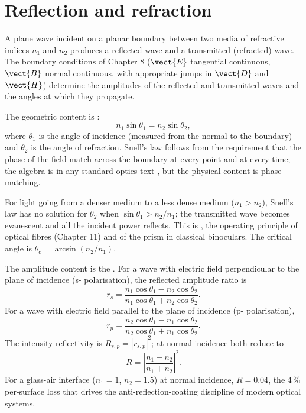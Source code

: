 \section{Reflection and refraction}

A plane wave incident on a planar boundary between two media of
refractive indices $n_{1}$ and $n_{2}$ produces a reflected wave and a
transmitted (refracted) wave. The boundary conditions of Chapter 8
($\vect{E}$ tangential continuous, $\vect{B}$ normal continuous, with
appropriate jumps in $\vect{D}$ and $\vect{H}$) determine the
amplitudes of the reflected and transmitted waves and the angles at
which they propagate.

The geometric content is :
\[
n_{1}\sin\theta_{1} = n_{2}\sin\theta_{2},
\]
where $\theta_{1}$ is the angle of incidence (measured from the
normal to the boundary) and $\theta_{2}$ is the angle of refraction.
Snell's law follows from the requirement that the phase of the field
match across the boundary at every point and at every time; the
algebra is in any standard optics text \cite{text:hecht-optics}, but
the physical content is phase-matching.

For light going from a denser medium to a less dense medium ($n_{1}>
n_{2}$), Snell's law has no solution for $\theta_{2}$ when $\sin
\theta_{1} > n_{2}/n_{1}$; the transmitted wave becomes evanescent
and all the incident power reflects. This is , the operating principle of optical fibres (Chapter 11)
and of the prism in classical binoculars. The critical angle is
$\theta_{c} = \arcsin(n_{2}/n_{1})$.

The amplitude content is the . For a wave
with electric field perpendicular to the plane of incidence (s-
polarisation), the reflected amplitude ratio is
\[
r_{s} = \frac{n_{1}\cos\theta_{1} - n_{2}\cos\theta_{2}}{n_{1}\cos
\theta_{1} + n_{2}\cos\theta_{2}}.
\]
For a wave with electric field parallel to the plane of incidence (p-
polarisation),
\[
r_{p} = \frac{n_{2}\cos\theta_{1} - n_{1}\cos\theta_{2}}{n_{2}\cos
\theta_{1} + n_{1}\cos\theta_{2}}.
\]
The intensity reflectivity is $R_{s,p} = |r_{s,p}|^{2}$; at normal
incidence both reduce to
\[
R = \left|\frac{n_{1}-n_{2}}{n_{1}+n_{2}}\right|^{2}.
\]
For a glass-air interface ($n_{1}=1$, $n_{2}=1.5$) at normal
incidence, $R = 0.04$, the $4\,\%$ per-surface loss that drives the
anti-reflection-coating discipline of modern optical systems.



